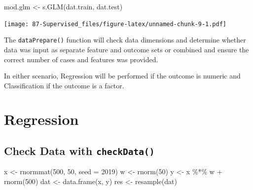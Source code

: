 \documentclass[
]{book}
\newenvironment{Shaded}{\begin{snugshade}}{\end{snugshade}}
\newcommand{\AttributeTok}[1]{\textcolor[rgb]{0.77,0.63,0.00}{#1}}
\newcommand{\DecValTok}[1]{\textcolor[rgb]{0.00,0.00,0.81}{#1}}
\newcommand{\FunctionTok}[1]{\textcolor[rgb]{0.00,0.00,0.00}{#1}}
\newcommand{\NormalTok}[1]{#1}
\newcommand{\OtherTok}[1]{\textcolor[rgb]{0.56,0.35,0.01}{#1}}
\newcommand{\SpecialCharTok}[1]{\textcolor[rgb]{0.00,0.00,0.00}{#1}}
\begin{document}
\begin{Shaded}
\begin{Highlighting}[]
\NormalTok{mod.glm }\OtherTok{\textless{}{-}} \FunctionTok{s.GLM}\NormalTok{(dat.train, dat.test)}
\end{Highlighting}
\end{Shaded}

\texttt{[image: 87-Supervised\_files/figure-latex/unnamed-chunk-9-1.pdf]}

The \texttt{dataPrepare()} function will check data dimensions and determine whether data was input as separate feature and outcome sets or combined and ensure the correct number of cases and features was provided.

In either scenario, Regression will be performed if the outcome is numeric and Classification if the outcome is a factor.

\hypertarget{regression}{%
\section{Regression}\label{regression}}

\hypertarget{check-data-with-checkdata}{%
\subsection{\texorpdfstring{Check Data with \texttt{checkData()}}{Check Data with checkData()}}\label{check-data-with-checkdata}}

\begin{Shaded}
\begin{Highlighting}[]
\NormalTok{x }\OtherTok{\textless{}{-}} \FunctionTok{rnormmat}\NormalTok{(}\DecValTok{500}\NormalTok{, }\DecValTok{50}\NormalTok{, }\AttributeTok{seed =} \DecValTok{2019}\NormalTok{)}
\NormalTok{w }\OtherTok{\textless{}{-}} \FunctionTok{rnorm}\NormalTok{(}\DecValTok{50}\NormalTok{)}
\NormalTok{y }\OtherTok{\textless{}{-}}\NormalTok{ x }\SpecialCharTok{\%*\%}\NormalTok{ w }\SpecialCharTok{+} \FunctionTok{rnorm}\NormalTok{(}\DecValTok{500}\NormalTok{)}
\NormalTok{dat }\OtherTok{\textless{}{-}} \FunctionTok{data.frame}\NormalTok{(x, y)}
\NormalTok{res }\OtherTok{\textless{}{-}} \FunctionTok{resample}\NormalTok{(dat)}
\end{Highlighting}
\end{Shaded}

\begin{Shaded}
\end{Shaded}
\end{document}
